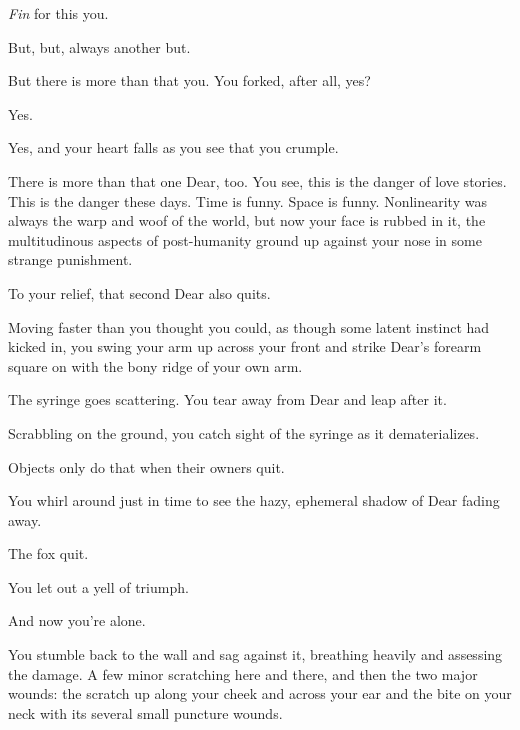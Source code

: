 \emph{Fin} for this you.

\vfill

\newpage

\null
\vfill

But, but, always another but.

But there is more than that you. You forked, after all, yes?

Yes.

Yes, and your heart falls as you see that you crumple.

There is more than that one Dear, too. You see, this is the danger of love stories. This is the danger these days. Time is funny. Space is funny. Nonlinearity was always the warp and woof of the world, but now your face is rubbed in it, the multitudinous aspects of post-humanity ground up against your nose in some strange punishment.

To your relief, that second Dear also quits.

Moving faster than you thought you could, as though some latent instinct had kicked in, you swing your arm up across your front and strike Dear's forearm square on with the bony ridge of your own arm.

The syringe goes scattering. You tear away from Dear and leap after it.

Scrabbling on the ground, you catch sight of the syringe as it dematerializes.

Objects only do that when their owners quit.

You whirl around just in time to see the hazy, ephemeral shadow of Dear fading away.

\vfill

\newpage

\null
\vfill

The fox quit.

\null
\vfill

\newpage

\null
\vfill

You let out a yell of triumph.

\null
\vfill

\newpage

\null
\vfill

And now you're alone.

\null
\vfill

\newpage

You stumble back to the wall and sag against it, breathing heavily and assessing the damage. A few minor scratching here and there, and then the two major wounds: the scratch up along your cheek and across your ear and the bite on your neck with its several small puncture wounds.

